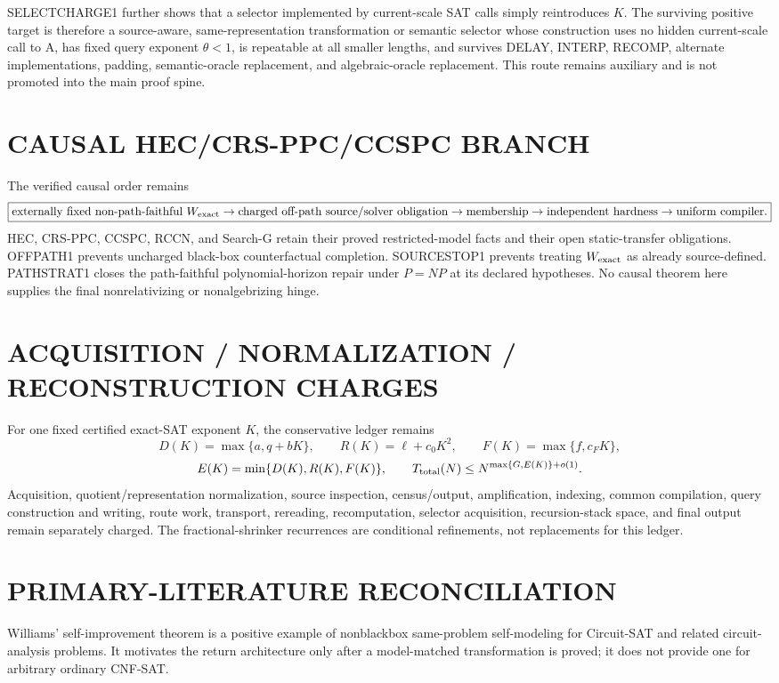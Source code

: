 \documentclass[11pt]{article}
\begin{document}
SELECTCHARGE1 further shows that a selector implemented by current-scale SAT calls simply reintroduces \(K\). The surviving positive target is therefore a source-aware, same-representation transformation or semantic selector whose construction uses no hidden current-scale call to A, has fixed query exponent \(\theta<1\), is repeatable at all smaller lengths, and survives DELAY, INTERP, RECOMP, alternate implementations, padding, semantic-oracle replacement, and algebraic-oracle replacement. This route remains auxiliary and is not promoted into the main proof spine.

\section*{CAUSAL HEC/CRS-PPC/CCSPC BRANCH}
The verified causal order remains
\[
\boxed{
\text{externally fixed non-path-faithful }W_{\rm exact}
\to
\text{charged off-path source/solver obligation}
\to
\text{membership}
\to
\text{independent hardness}
\to
\text{uniform compiler}.}
\]
HEC, CRS-PPC, CCSPC, RCCN, and Search-G retain their proved restricted-model facts and their open static-transfer obligations. OFFPATH1 prevents uncharged black-box counterfactual completion. SOURCESTOP1 prevents treating \(W_{\rm exact}\) as already source-defined. PATHSTRAT1 closes the path-faithful polynomial-horizon repair under \(P=NP\) at its declared hypotheses. No causal theorem here supplies the final nonrelativizing or nonalgebrizing hinge.

\section*{ACQUISITION / NORMALIZATION / RECONSTRUCTION CHARGES}
For one fixed certified exact-SAT exponent \(K\), the conservative ledger remains
\[
D(K)=\max\{a,q+bK\},\qquad
R(K)=\ell+c_0K^2,\qquad
F(K)=\max\{f,c_FK\},
\]
\[
E(K)=\min\{D(K),R(K),F(K)\},
\qquad
T_{\rm total}(N)\le N^{\max\{G,E(K)\}+o(1)}.
\]
Acquisition, quotient/representation normalization, source inspection, census/output, amplification, indexing, common compilation, query construction and writing, route work, transport, rereading, recomputation, selector acquisition, recursion-stack space, and final output remain separately charged. The fractional-shrinker recurrences are conditional refinements, not replacements for this ledger.

\section*{PRIMARY-LITERATURE RECONCILIATION}
Williams' self-improvement theorem is a positive example of nonblackbox same-problem self-modeling for Circuit-SAT and related circuit-analysis problems. It motivates the return architecture only after a model-matched transformation is proved; it does not provide one for arbitrary ordinary CNF-SAT.
\end{document}
